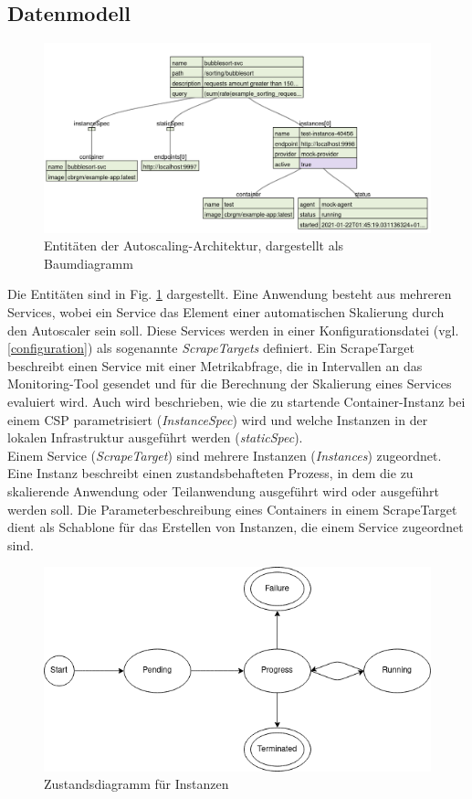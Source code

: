 \documentclass[runningheads]{llncs}
\begin{document}
\subsection{Datenmodell}

\begin{figure}
	\centering
	\includegraphics[width=0.8\linewidth,scale=0.8]{images/datamodel.png}
	\caption{Entitäten der Autoscaling-Architektur, dargestellt als Baumdiagramm}
	\label{datenmodell}
\end{figure}

Die Entitäten sind in Fig. \ref{datenmodell} dargestellt. Eine Anwendung besteht aus mehreren Services, wobei ein Service das Element einer automatischen Skalierung durch den Autoscaler sein soll. Diese Services werden in einer Konfigurationsdatei (vgl. \ref{configuration}) als sogenannte \textit{ScrapeTargets} definiert. Ein ScrapeTarget beschreibt einen Service mit einer Metrikabfrage, die in Intervallen an das Monitoring-Tool gesendet und für die Berechnung der Skalierung eines Services evaluiert wird. Auch wird beschrieben, wie die zu startende Container-Instanz bei einem CSP parametrisiert (\textit{InstanceSpec}) wird und welche Instanzen in der lokalen Infrastruktur ausgeführt werden (\textit{staticSpec}). \\

Einem Service (\textit{ScrapeTarget}) sind mehrere Instanzen (\textit{Instances}) zugeordnet. Eine Instanz beschreibt einen zustandsbehafteten Prozess, in dem die zu skalierende Anwendung oder Teilanwendung ausgeführt wird oder ausgeführt werden soll. Die Parameterbeschreibung eines Containers  in einem ScrapeTarget dient als Schablone für das Erstellen von Instanzen, die einem Service zugeordnet sind.

\begin{figure}
	\centering
	\includegraphics[width=0.6\linewidth,scale=0.6]{images/state.png}
	\caption{Zustandsdiagramm für Instanzen}
\end{figure}
\end{document}
